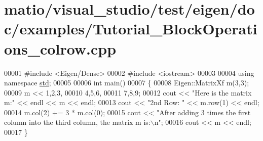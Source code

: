 \hypertarget{matio_2visual__studio_2test_2eigen_2doc_2examples_2_tutorial___block_operations__colrow_8cpp_source}{}\section{matio/visual\+\_\+studio/test/eigen/doc/examples/\+Tutorial\+\_\+\+Block\+Operations\+\_\+colrow.cpp}
\label{matio_2visual__studio_2test_2eigen_2doc_2examples_2_tutorial___block_operations__colrow_8cpp_source}

\begin{DoxyCode}
00001 \textcolor{preprocessor}{#include <Eigen/Dense>}
00002 \textcolor{preprocessor}{#include <iostream>}
00003 
00004 \textcolor{keyword}{using namespace }\hyperlink{namespacestd}{std};
00005 
00006 \textcolor{keywordtype}{int} main()
00007 \{
00008   Eigen::MatrixXf m(3,3);
00009   m << 1,2,3,
00010        4,5,6,
00011        7,8,9;
00012   cout << \textcolor{stringliteral}{"Here is the matrix m:"} << endl << m << endl;
00013   cout << \textcolor{stringliteral}{"2nd Row: "} << m.row(1) << endl;
00014   m.col(2) += 3 * m.col(0);
00015   cout << \textcolor{stringliteral}{"After adding 3 times the first column into the third column, the matrix m is:\(\backslash\)n"};
00016   cout << m << endl;
00017 \}
\end{DoxyCode}
